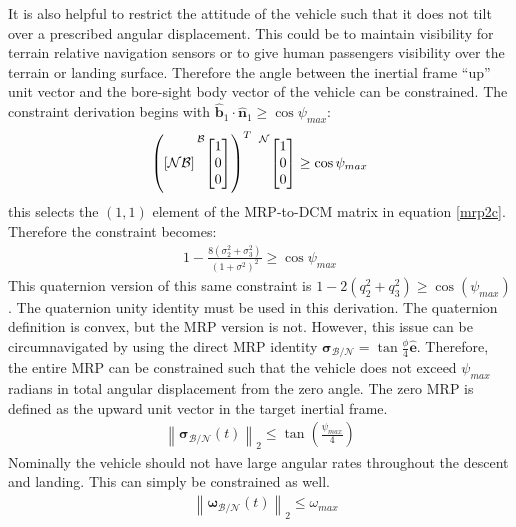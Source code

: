 \documentclass[conf]{new-aiaa}
\begin{document}
It is also helpful to restrict the attitude of the vehicle such that it does not tilt over a prescribed angular displacement. This could be to maintain visibility for terrain relative navigation sensors or to give human passengers visibility over the terrain or landing surface. Therefore the angle between the inertial frame ``up'' unit vector and the bore-sight body vector of the vehicle can be constrained. The constraint derivation begins with $\hat{\bm{b}}_1 \cdot \hat{\bm{n}}_1 \geq \cos{\psi_{max}}$:
\begin{align}
	\left (
	[\mathcal{NB}]
	\prescript{\mathcal{B}}{}{
	\begin{bmatrix}
		1 \\ 0 \\ 0
	\end{bmatrix}}
	\right )^T \
	\prescript{\mathcal{N}}{}{
	\begin{bmatrix}
		1 \\  0 \\ 0
	\end{bmatrix}}
	\geq \cos{\psi_{max}}
\end{align}
this selects the $(1,1)$ element of the MRP-to-DCM matrix in equation \ref{mrp2c}. Therefore the constraint becomes:
%
\begin{align}
\label{alignconstraint}
	1- \frac{8(\sigma_2^2 + \sigma_3^2)}{(1+\sigma^2)^2} \geq \cos{\psi_{max}}
\end{align}
This quaternion version of this same constraint is $1-2(q_{2}^{2}+q_{3}^{2}) \geq \cos(\psi_{max})$. The quaternion unity identity must be used in this derivation. The quaternion definition is convex, but the MRP version is not. However, this issue can be circumnavigated by using the direct MRP identity $\boldsymbol{\sigma}_\mathcal{B/N} = \tan\frac{\phi}{4}\hat{\bm{e}}$. Therefore, the entire MRP can be constrained such that the vehicle does not exceed $\psi_{max}$ radians in total angular displacement from the zero angle. The zero MRP is defined as the upward unit vector in the target inertial frame.
\begin{align}
	\left \lVert \boldsymbol{\sigma}_\mathcal{B/N} (t) \right \lVert_2 \leq \tan \left( \frac{\psi_{max}}{4} \right)
\end{align}
Nominally the vehicle should not have large angular rates throughout the descent and landing. This can simply be constrained as well.
\begin{align}
& \left \lVert \bm{\omega}_\mathcal{B/N}(t) \right \lVert_2 \leq \omega_{max}
\end{align}
\end{document}
